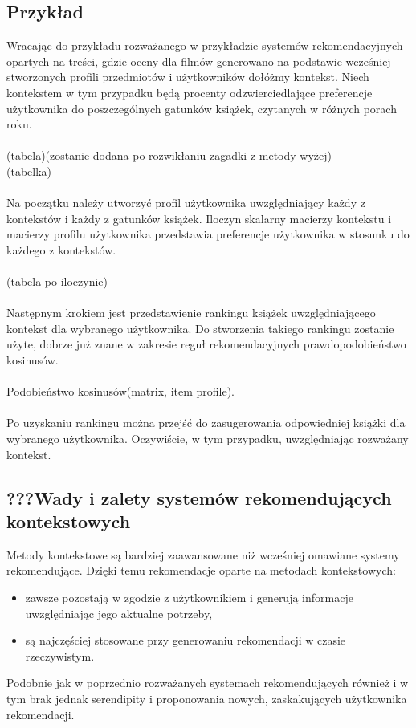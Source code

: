 \documentclass[12pt,a4paper]{report}
\begin{document}
{\subsection{Przykład}
Wracając do przykładu rozważanego w przykładzie systemów rekomendacyjnych opartych na treści, gdzie oceny dla filmów generowano na podstawie wcześniej stworzonych profili przedmiotów i użytkowników dołóżmy kontekst.
Niech kontekstem w tym przypadku będą procenty odzwierciedlające preferencje użytkownika do poszczególnych gatunków książek, czytanych w różnych porach roku.
\\
\\(tabela)(zostanie dodana po rozwikłaniu zagadki z metody wyżej)
\\(tabelka)
\\
\\Na początku należy utworzyć profil użytkownika uwzględniający każdy z kontekstów i każdy z gatunków książek. 
Iloczyn skalarny macierzy kontekstu i macierzy profilu użytkownika przedstawia preferencje użytkownika w stosunku do każdego z kontekstów.
\\
\\(tabela po iloczynie)
\\
\\Następnym krokiem jest przedstawienie rankingu książek uwzględniającego kontekst dla wybranego użytkownika.
Do stworzenia takiego rankingu zostanie użyte, dobrze już znane w zakresie reguł rekomendacyjnych prawdopodobieństwo kosinusów.
\\
\\Podobieństwo kosinusów(matrix, item profile).
\\
\\Po uzyskaniu rankingu można przejść do zasugerowania odpowiedniej książki dla wybranego użytkownika. Oczywiście, w tym przypadku, uwzględniając rozważany kontekst.

\subsection{???Wady i zalety systemów rekomendujących kontekstowych}
Metody kontekstowe są bardziej zaawansowane niż wcześniej omawiane systemy rekomendujące. Dzięki temu rekomendacje oparte na metodach kontekstowych:
\begin{itemize}
\item  zawsze pozostają w zgodzie z użytkownikiem i generują informacje uwzględniając jego aktualne potrzeby,
\item  są najczęściej stosowane przy generowaniu rekomendacji w czasie rzeczywistym.
\end{itemize}
Podobnie jak w poprzednio rozważanych systemach rekomendujących również i w tym brak jednak serendipity i proponowania nowych, zaskakujących użytkownika rekomendacji. 
}
\end{document}
